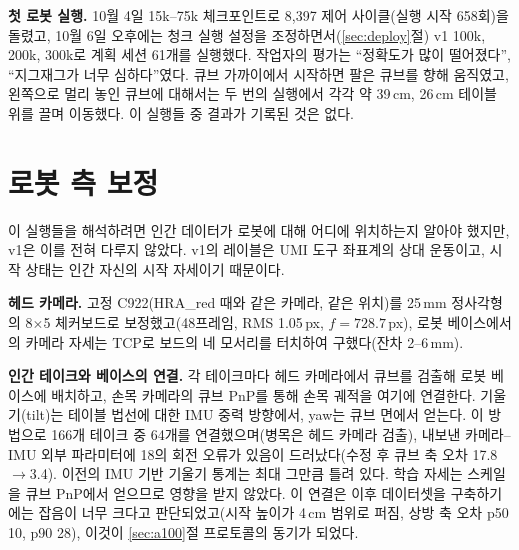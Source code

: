 \documentclass[conference,10pt]{IEEEtran}
\newcommand{\mm}{\,mm\xspace}
\begin{document}
\begin{table}[t]
\centering\footnotesize\setlength{\tabcolsep}{3pt}
\caption{체크포인트별 held-out 손실(지도되는 9차원에 대한 마스킹된 MSE). 괄호 안은 학습 부분집합 손실.}
\label{tab:val}
\end{table}

\textbf{첫 로봇 실행.} 10월 4일 15k--75k 체크포인트로 8{,}397 제어 사이클(실행 시작 658회)을 돌렸고, 10월 6일 오후에는
청크 실행 설정을 조정하면서(\ref{sec:deploy}절) v1 100k, 200k, 300k로 계획 세션 61개를 실행했다. 작업자의 평가는
“정확도가 많이 떨어졌다”, “지그재그가 너무 심하다”였다. 큐브 가까이에서 시작하면 팔은 큐브를 향해 움직였고, 왼쪽으로 멀리
놓인 큐브에 대해서는 두 번의 실행에서 각각 약 39\,cm, 26\,cm 테이블 위를 끌며 이동했다. 이 실행들 중 결과가 기록된 것은
없다.

\section{로봇 측 보정}\label{sec:robotcal}
이 실행들을 해석하려면 인간 데이터가 로봇에 대해 어디에 위치하는지 알아야 했지만, v1은 이를 전혀 다루지 않았다. v1의
레이블은 UMI 도구 좌표계의 상대 운동이고, 시작 상태는 인간 자신의 시작 자세이기 때문이다.

\textbf{헤드 카메라.} 고정 C922(HRA\_red 때와 같은 카메라, 같은 위치)를 25\mm 정사각형의 8$\times$5 체커보드로
보정했고(48프레임, RMS 1.05\,px, $f=728.7$\,px), 로봇 베이스에서의 카메라 자세는 TCP로 보드의 네 모서리를 터치하여
구했다(잔차 2--6\mm).

\textbf{인간 테이크와 베이스의 연결.} 각 테이크마다 헤드 카메라에서 큐브를 검출해 로봇 베이스에 배치하고, 손목 카메라의
큐브 PnP를 통해 손목 궤적을 여기에 연결한다. 기울기(tilt)는 테이블 법선에 대한 IMU 중력 방향에서, yaw는 큐브 면에서
얻는다. 이 방법으로 166개 테이크 중 64개를 연결했으며(병목은 헤드 카메라 검출), 내보낸 카메라--IMU 외부 파라미터에
18\textdegree{}의 회전 오류가 있음이 드러났다(수정 후 큐브 축 오차 17.8$\to$3.4\textdegree). 이전의 IMU 기반 기울기
통계는 최대 그만큼 틀려 있다. 학습 자세는 스케일을 큐브 PnP에서 얻으므로 영향을 받지 않았다. 이 연결은 이후 데이터셋을
구축하기에는 잡음이 너무 크다고 판단되었고(시작 높이가 4\,cm 범위로 퍼짐, 상방 축 오차 p50 10\textdegree, p90
28\textdegree), 이것이 \ref{sec:a100}절 프로토콜의 동기가 되었다.
\end{document}
